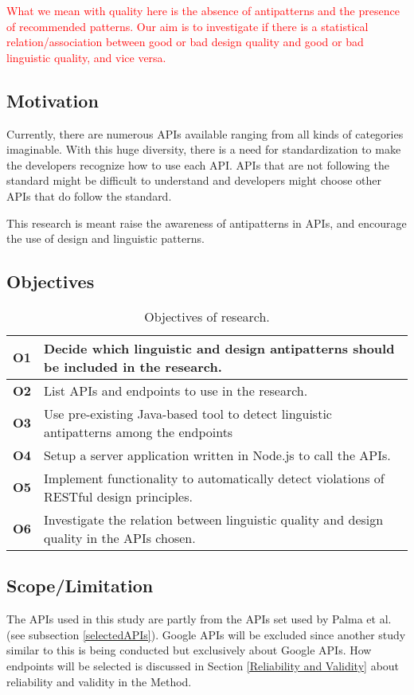 \textcolor{red}{What we mean with quality here is the absence of antipatterns and the presence of recommended patterns. Our aim is to investigate if there is a statistical relation/association between good or bad design quality and good or bad linguistic quality, and vice versa. }

\subsection{Motivation}
Currently, there are numerous APIs available ranging from all kinds of categories imaginable. With this huge diversity, there is a need for standardization to make the developers recognize how to use each API. APIs that are not following the standard might be difficult to understand and developers might choose other APIs that do follow the standard.

This research is meant raise the awareness of antipatterns in APIs, and encourage the use of design and linguistic patterns. 

\subsection{Objectives}


\begin{table}[!ht]
\begin{center}
\begin{tabular} {|p{1.2cm}|p{11.6cm}|} \hline
\textbf{O1} & Decide which linguistic and design antipatterns should be included in the research. \\ \hline
\textbf{O2} & List APIs and endpoints to use in the research. \\ \hline
\textbf{O3} & Use pre-existing Java-based tool to detect linguistic antipatterns among the endpoints \\ \hline
\textbf{O4} & Setup a server application written in Node.js to call the APIs. \\ \hline
\textbf{O5} & Implement functionality to automatically detect violations of RESTful design principles.\\ \hline
\textbf{O6} & Investigate the relation between linguistic quality and design quality in the APIs chosen. \\ \hline
\end{tabular}
 \caption{Objectives of research.}
 \label{tab:Objectives}
\end{center} 
\end{table}

\subsection{Scope/Limitation}
The APIs used in this study are partly from the APIs set used by Palma et al. \cite{linguistic} (see subsection \ref{selectedAPIs}). Google APIs will be excluded since another study similar to this is being conducted but exclusively about Google APIs. How endpoints will be selected is discussed in Section \ref{Reliability and Validity} about reliability and validity in the Method.


